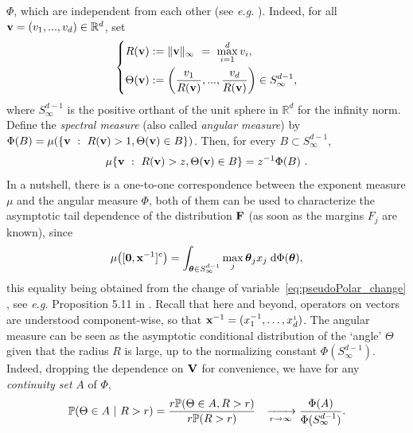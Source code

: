 $\Phi$, which are independent from each other (see \emph{e.g.} \cite{dR1977}).
Indeed, for all $\mathbf v = (v_1,...,v_d) \in \mathbb{R}^d$, set
\begin{align}\label{eq:pseudoPolar_change}
  \left\{ \begin{aligned}
R(\mathbf v)&:= \|\mathbf v\|_\infty ~=~ \max_{i=1}^d v_i, \\
\Theta (\mathbf v) &:= \left( \frac{v_1}{R(\mathbf v)},..., \frac{v_d}{R(\mathbf v)} \right)
\in S_\infty^{d-1},     
  \end{aligned}\right.
\end{align}
where $S_\infty^{d-1}$ is the positive orthant of  the unit sphere in $\mathbb{R}^d$ for the infinity norm.
Define the \emph{ spectral measure} (also called \emph{angular measure}) by $\Phi(B)= \mu (\{\mathbf v~:~R(\mathbf v)>1 ,
\Theta(\mathbf v) \in B \})$. Then, for every $B
\subset S_\infty^{d-1}$, 
\begin{align}
\label{mu-phi}
\mu\{\mathbf v~:~R(\mathbf v)>z, \Theta(\mathbf v) \in B \} = z^{-1} \Phi (B)~. 
\end{align}
In a nutshell,  there
is a one-to-one correspondence between the exponent measure $\mu$ and the angular measure
$\Phi$, both of them can be used to characterize the asymptotic tail
dependence of the distribution $\mathbf F$ (as
soon as the  margins $F_j$ are known), since   %
\begin{align}\label{eq:integratePhiLambda}
  \mu \big( [\mathbf 0,\mathbf{x}^{-1}]^c \big) =  \int_{\boldsymbol{\theta} \in S_{\infty}^{d-1}}   \max_j{\boldsymbol{\theta}_j x_j} \;\mathrm{d} \Phi(\boldsymbol{\theta}),
\end{align}
this equality being obtained from the change of variable~\eqref{eq:pseudoPolar_change} , see \emph{e.g.} Proposition 5.11 in \cite{Resnick1987}. 
Recall that here and beyond, operators on vectors are understood component-wise, so that $\mathbf x^{-1}=(x_1^{-1},\ldots,x_d^{_1})$.
The angular measure can be seen as the asymptotic conditional distribution of the
`angle' $\Theta$ given that the radius $R$ is large, up to the
normalizing constant $\Phi(S_\infty^{d-1})$. Indeed, dropping
the dependence on $\mathbf V$ for convenience, we have for any
\emph{continuity set} $A$ of $\Phi$, 
\begin{align}
  \label{eq:limitConditAngle}
\begin{aligned}
  \mathbb{P}(\Theta \in A ~|~R>r ) &= 
\frac{r  \mathbb{P}(\Theta \in A , R>r ) }{r\mathbb{P}(R>r)} 
& \xrightarrow[r\to \infty]{} \frac{\Phi(A)}{\Phi(S_\infty^{d-1})} .
\end{aligned}  
\end{align}
